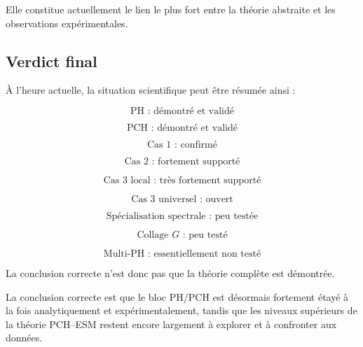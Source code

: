 Elle constitue actuellement le lien le plus fort entre la théorie abstraite et les observations expérimentales.

\subsection{Verdict final}

À l'heure actuelle, la situation scientifique peut être résumée ainsi :

\[
\boxed{
\text{PH : démontré et validé}
}
\]

\[
\boxed{
\text{PCH : démontré et validé}
}
\]

\[
\boxed{
\text{Cas 1 : confirmé}
}
\]

\[
\boxed{
\text{Cas 2 : fortement supporté}
}
\]

\[
\boxed{
\text{Cas 3 local : très fortement supporté}
}
\]

\[
\boxed{
\text{Cas 3 universel : ouvert}
}
\]

\[
\boxed{
\text{Spécialisation spectrale : peu testée}
}
\]

\[
\boxed{
\text{Collage }G\text{ : peu testé}
}
\]

\[
\boxed{
\text{Multi-PH : essentiellement non testé}
}
\]

La conclusion correcte n'est donc pas que la théorie complète est démontrée.

La conclusion correcte est que le bloc PH/PCH est désormais fortement étayé à la fois analytiquement et expérimentalement, tandis que les niveaux supérieurs de la théorie PCH--ESM restent encore largement à explorer et à confronter aux données.